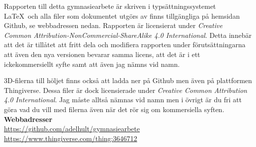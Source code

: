 Rapporten till detta gymnasiearbete är skriven i typsättningssystemet \LaTeX \ och alla filer som dokumentet utgörs av finns tillgängliga på hemsidan Github, se webbadressen nedan.  Rapporten är licensierat under \textit{Creative Common Attribution-NonCommercial-ShareAlike 4.0 International}. Detta innebär att det är tillåtet att fritt dela och modifiera rapporten under förutsättningarna att även den nya versionen bevarar samma licens, att det är i ett ickekommersiellt syfte samt att även jag nämns vid namn.

3D-filerna till höljet finns också att ladda ner på Github men även på plattformen Thingiverse. Dessa filer är dock licensierade under\textit{ Creative Common Attribution 4.0 International}. Jag måste alltså nämnas vid namn men i övrigt är du fri att göra vad du vill med filerna även när det rör sig om  kommersiella syften. \\

\noindent\textbf{Webbadresser}\\
\url{https://github.com/adelhult/gymnasiearbete}\\
\url{https://www.thingiverse.com/thing:3646712}
